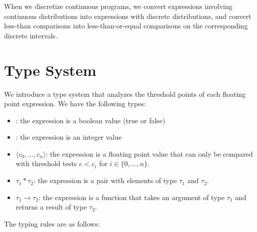 \documentclass[nonacm,anonymous]{acmart}
\newcommand{\bool}{\text{\ttfamily\bfseries bool}}
\newcommand{\intty}{\text{\ttfamily\bfseries int}}
\newcommand{\float}{\text{\ttfamily\bfseries float}}
\begin{document}
When we discretize continuous programs, we convert expressions involving continuous distributions into expressions with discrete distributions, and convert less-than comparisons into less-than-or-equal comparisons on the corresponding discrete intervals.

\section{Type System}

We introduce a type system that analyzes the threshold points of each floating point expression. We have the following types:
\begin{itemize}
    \item \bool: the expression is a boolean value (true or false)
    \item \intty: the expression is an integer value
    \item \float$\langle c_0, \ldots, c_n \rangle$: the expression is a floating point value that can only be compared with threshold tests $e < c_i$ for $i \in \{0, \ldots, n\}$.
    \item $\tau_1 * \tau_2$: the expression is a pair with elements of type $\tau_1$ and $\tau_2$.
    \item $\tau_1 \rightarrow \tau_2$: the expression is a function that takes an argument of type $\tau_1$ and returns a result of type $\tau_2$.
\end{itemize}

The typing rules are as follows:
\end{document}
